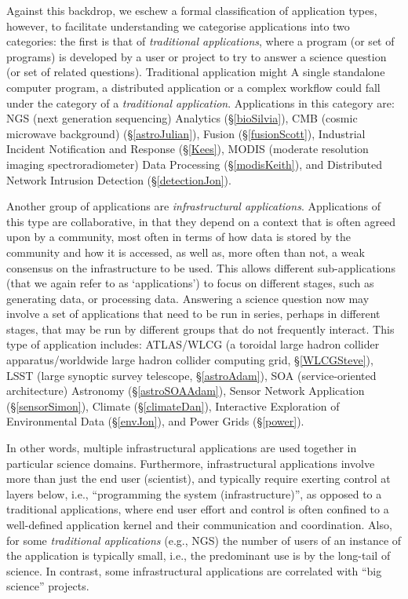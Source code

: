 Against this backdrop, we eschew a formal classification of application types,
however, to facilitate understanding we categorise applications into two
categories: the first is that of {\em traditional applications}, where
a program (or set of programs) is developed by a user or project to try to
answer a science question (or set of related questions). Traditional application
might A single standalone computer program, a distributed application or a
complex workflow could fall under the category of a {\em traditional
  application}.  Applications in this category are: NGS (next generation
sequencing) Analytics (\S\ref{bioSilvia}), CMB (cosmic microwave background)
(\S\ref{astroJulian}), Fusion (\S\ref{fusionScott}), Industrial Incident
Notification and Response (\S\ref{Kees}), MODIS (moderate resolution imaging
spectroradiometer) Data Processing (\S\ref{modisKeith}), and Distributed Network
Intrusion Detection (\S\ref{detectionJon}).

Another group of applications are {\em infrastructural applications}.
Applications of this type are collaborative, in that they depend on a context
that is often agreed upon by a community, most often in terms of how data is
stored by the community and how it is accessed, as well as, more often than not,
a weak consensus on the infrastructure to be used.  This allows different
sub-applications (that we again refer to as `applications') to focus on
different stages, such as generating data, or processing data.  Answering a
science question now may involve a set of applications that need to be run in
series, perhaps in different stages, that may be run by different groups that do
not frequently interact.  This type of application includes: ATLAS/WLCG (a
toroidal large hadron collider apparatus/worldwide large hadron collider
computing grid, \S\ref{WLCGSteve}), LSST (large synoptic survey telescope,
\S\ref{astroAdam}), SOA (service-oriented architecture) Astronomy
(\S\ref{astroSOAAdam}), Sensor Network Application (\S\ref{sensorSimon}),
Climate (\S\ref{climateDan}), Interactive Exploration of Environmental Data
(\S\ref{envJon}), and Power Grids (\S\ref{power}).

In other words, multiple infrastructural applications are used together in
particular science domains.  Furthermore, infrastructural applications involve
more than just the end user (scientist), and typically require exerting control
at layers below, i.e., ``programming the system (infrastructure)'', as opposed
to a traditional applications, where end user effort and control is often
confined to a well-defined application kernel and their communication and
coordination.  Also, for some {\em traditional applications} (e.g., NGS) the
number of users of an instance of the application is typically small, i.e., the
predominant use is by the long-tail of science. In contrast, some
infrastructural applications are correlated with ``big science'' projects.

